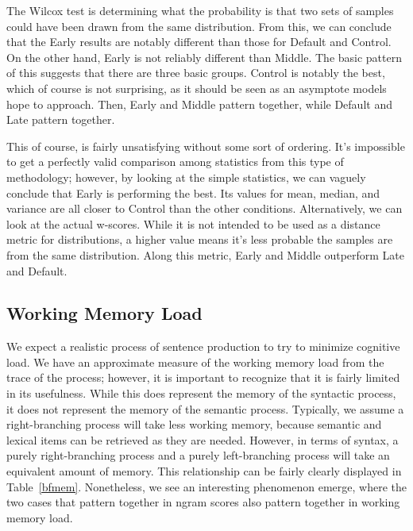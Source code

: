 The Wilcox test is determining what the probability is that two sets of samples could have been drawn from the same distribution. From this, we can conclude that the Early results are notably different than those for Default and Control. On the other hand, Early is not reliably different than Middle. The basic pattern of this suggests that there are three basic groups. Control is notably the best, which of course is not surprising, as it should be seen as an asymptote models hope to approach. Then, Early and Middle pattern together, while Default and Late pattern together. 

This of course, is fairly unsatisfying without some sort of ordering. It's impossible to get a perfectly valid comparison among statistics from this type of methodology; however, by looking at the simple statistics, we can vaguely conclude that Early is performing the best. Its values for mean, median, and variance are all closer to Control than the other conditions. Alternatively, we can look at the actual w-scores. While it is not intended to be used as a distance metric for distributions, a higher value means it's less probable the samples are from the same distribution. Along this metric, Early and Middle outperform Late and Default. 



\subsection{Working Memory Load}
We expect a realistic process of sentence production to try to minimize cognitive load. We have an approximate measure of the working memory load from the trace of the process; however, it is important to recognize that it is fairly limited in its usefulness. While this does represent the memory of the syntactic process, it does not represent the memory of the semantic process. Typically, we assume a right-branching process will take less working memory, because semantic and lexical items can be retrieved as they are needed. However, in terms of syntax, a purely right-branching process and a purely left-branching process will take an equivalent amount of memory. This relationship can be fairly clearly displayed in Table~\ref{bfmem}. Nonetheless, we see an interesting phenomenon emerge, where the two cases that pattern together in ngram scores also pattern together in working memory load.

